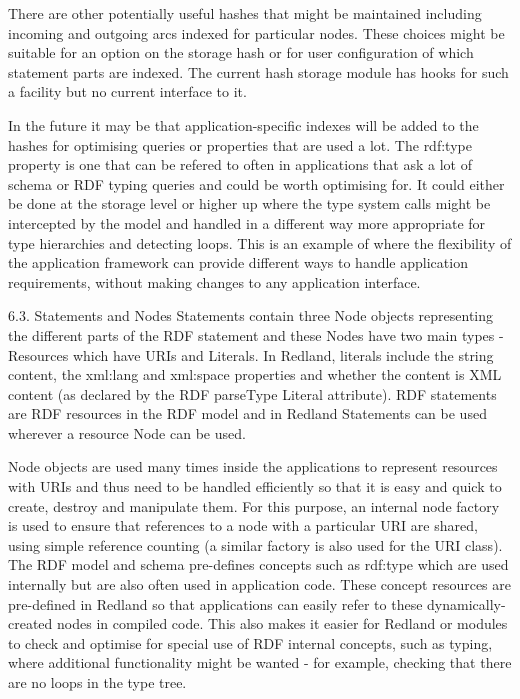 \documentclass[11pt]{article}
\begin{document}
    There are other potentially useful hashes that might be maintained including incoming and outgoing arcs indexed for particular nodes. These choices might be suitable for an option on the storage hash or for user configuration of which statement parts are indexed. The current hash storage module has hooks for such a facility but no current interface to it.

    In the future it may be that application-specific indexes will be added to the hashes for optimising queries or properties that are used a lot. The rdf:type property is one that can be refered to often in applications that ask a lot of schema or RDF typing queries and could be worth optimising for. It could either be done at the storage level or higher up where the type system calls might be intercepted by the model and handled in a different way more appropriate for type hierarchies and detecting loops. This is an example of where the flexibility of the application framework can provide different ways to handle application requirements, without making changes to any application interface.

    6.3. Statements and Nodes
    Statements contain three Node objects representing the different parts of the RDF statement and these Nodes have two main types - Resources which have URIs and Literals. In Redland, literals include the string content, the xml:lang and xml:space properties and whether the content is XML content (as declared by the RDF parseType Literal attribute). RDF statements are RDF resources in the RDF model and in Redland Statements can be used wherever a resource Node can be used.

    Node objects are used many times inside the applications to represent resources with URIs and thus need to be handled efficiently so that it is easy and quick to create, destroy and manipulate them. For this purpose, an internal node factory is used to ensure that references to a node with a particular URI are shared, using simple reference counting (a similar factory is also used for the URI class). The RDF model and schema pre-defines concepts such as rdf:type which are used internally but are also often used in application code. These concept resources are pre-defined in Redland so that applications can easily refer to these dynamically-created nodes in compiled code. This also makes it easier for Redland or modules to check and optimise for special use of RDF internal concepts, such as typing, where additional functionality might be wanted - for example, checking that there are no loops in the type tree.
\end{document}
